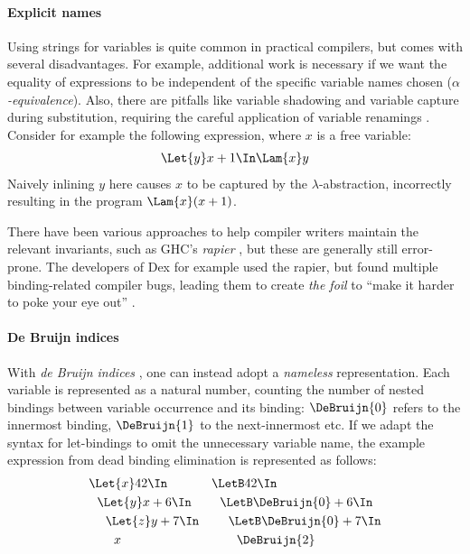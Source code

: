   \paragraph{Explicit names}
    Using strings for variables is quite common in practical compilers,
    but comes with several disadvantages.
    For example, additional work is necessary
    if we want the equality of expressions to be independent of the specific variable names chosen
    (\emph{$\alpha$-equivalence}).
    Also, there are pitfalls like variable shadowing and variable capture during substitution,
    requiring the careful application of variable renamings
    \cite{Barendregt1985LambdaCalculus}.
    Consider for example the following expression, where $x$ is a free variable:
    \begin{align*}
      \Let{y} x + 1 \In \Lam{x} y
    \end{align*}
    Naively inlining $y$ here causes $x$ to be captured
    by the $\lambda$-abstraction, incorrectly resulting in the program
    $\Lam{x} (x + 1)$.

    There have been various approaches to help compiler writers
    maintain the relevant invariants,
    such as GHC's \emph{rapier} \cite{Jones2002GHCInliner},
    but these are generally still error-prone.
    The developers of Dex for example used the rapier,
    but found multiple binding-related compiler bugs,
    leading them to create \emph{the foil}
    to ``make it harder to poke your eye out''
    \cite{Maclaurin2022Foil}.

  \paragraph{De Bruijn indices}
    With \emph{de Bruijn indices}
    \cite{DeBruijn1972NamelessIndices},
    one can instead adopt a \emph{nameless} representation.
    Each variable is represented as a natural number,
    counting the number of nested bindings between variable occurrence and its binding:
    $\DeBruijn{0}$ refers to the innermost binding, $\DeBruijn{1}$ to the next-innermost etc.
    If we adapt the syntax for let-bindings to omit the unnecessary variable name,
    the example expression from dead binding elimination is represented as follows:
    \begin{align*}
      &\Let{x} 42 \In            & &\LetB 42 \In                       \\
      &\ \ \Let{y} x + 6 \In     & &\ \ \LetB \DeBruijn{0} + 6 \In     \\
      &\ \ \ \ \Let{z} y + 7 \In & &\ \ \ \ \LetB \DeBruijn{0} + 7 \In \\
      &\ \ \ \ \ \ x             & &\ \ \ \ \ \ \DeBruijn{2}
    \end{align*}

